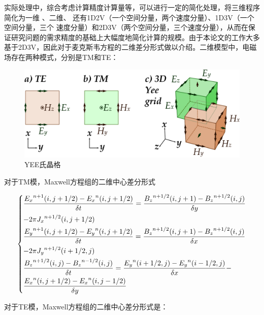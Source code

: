 实际处理中，综合考虑计算精度计算量等，可以进行一定的简化处理，将三维程序简化为一维 、二维、
还有1D2V（一个空间分量，两个速度分量）、1D3V（一个空间分量，三个
速度分量）和2D3V（两个空间分量，三个速度分量），从而在保证研究问题的需求精度的基础上大幅度地简化计算的规模。由于本论文的工作大多基于2D3V，因此对于麦克斯韦方程的二维差分形式做以介绍。二维模型中，电磁场存在两种模式，分别是TM和TE：

\begin{figure}[!htbp]
  \centering
  \includegraphics[width=\MyFactor\textwidth]{Img/Yee2D.eps}
  \caption{YEE氏晶格}
  \label{fig:yee}
\end{figure}



对于TM模，Maxwell方程组的二维中心差分形式

\begin{equation}
\label{eqn:maxwell_TM}
\begin{dcases*}
\frac{ {E_x}^{n+1}(i,j+1/2)-{E_x}^{n}(i,j+1/2)}{\delta t} = \frac{ {B_z}^{n+1/2}(i,j+1)-{B_z}^{n+1/2}(i,j)}{\delta y} \\
-2 \pi {J_x}^{n+1/2}(i,j+1/2)  \\
\frac{ {E_y}^{n+1}(i,j+1/2)-{E_y}^{n}(i,j+1/2)}{\delta t} = \frac{ {B_z}^{n+1/2}(i,j+1)-{B_z}^{n+1/2}(i,j)}{\delta x}  \\
-2 \pi {J_y}^{n+1/2}(i+1/2,j)  \\
\frac{ {B_z}^{n+1/2}(i,j)-{B_z}^{n-1/2}(i,j)}{\delta t} = \frac{ {E_y}^{n}(i+1/2,j)-{E_y}^{n}(i-1/2,j)}{\delta x}-   \\
\frac{ {E_x}^{n}(i,j+1/2)-{E_x}^{n}(i,j-1/2)}{\delta y}
\end{dcases*}
\end{equation} 


对于TE模，Maxwell方程组的二维中心差分形式是：


